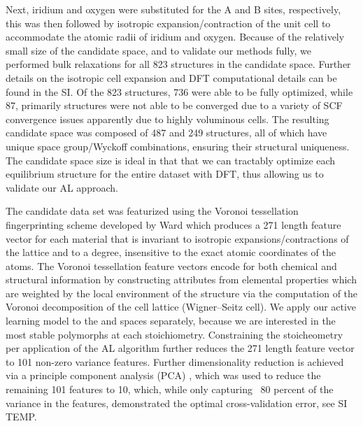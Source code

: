 %
Next, iridium and oxygen were substituted for the A and B sites, respectively,
this was then followed by isotropic expansion/contraction of the unit cell to accommodate the atomic radii of iridium and oxygen.
%
Because of the relatively small size of the candidate space, and to validate our methods fully, we performed bulk relaxations for all \num{823} structures in the candidate space.
%
Further details on the isotropic cell expansion and DFT computational details can be found in the SI.
%
Of the \num{823} structures, \num{736} were able to be fully optimized, while \num{87}, primarily \ABtwo structures were not able to be converged due to a variety of SCF convergence issues apparently due to highly voluminous cells.
%
The resulting candidate space was composed of \num{487} \IrOtwo and \num{249} \IrOthree structures, all of which have unique space group/Wyckoff combinations, ensuring their structural uniqueness.
%
%
The candidate space size is ideal in that that we can tractably optimize each equilibrium structure for the entire dataset with DFT, thus allowing us to validate our AL approach.


%
%
The candidate data set was featurized using the Voronoi tessellation fingerprinting scheme developed by Ward  \cite{Ward2017} which produces a \num{271} length feature vector for each material that is invariant to isotropic expansions/contractions of the lattice and to a degree, insensitive to the exact atomic coordinates of the atoms.
%
The Voronoi tessellation feature vectors encode for both chemical and structural information by constructing attributes from elemental properties which are weighted by the local environment of the structure via the computation of the Voronoi decomposition of the cell lattice (Wigner–Seitz cell).
%
We apply our active learning model to the \IrOtwo and \IrOthree spaces separately, because we are interested in the most stable polymorphs at each stoichiometry.
%
Constraining the stoicheometry per application of the AL algorithm further reduces the \num{271} length  feature vector to \num{101} non-zero variance features.%
%
Further dimensionality reduction is achieved via a principle component analysis (PCA) \cite{Tipping1999}, which was used to reduce the remaining \num{101} features to \num{10}, which, while only capturing ~80 percent of the variance in the features, demonstrated the optimal cross-validation error, see SI TEMP.


